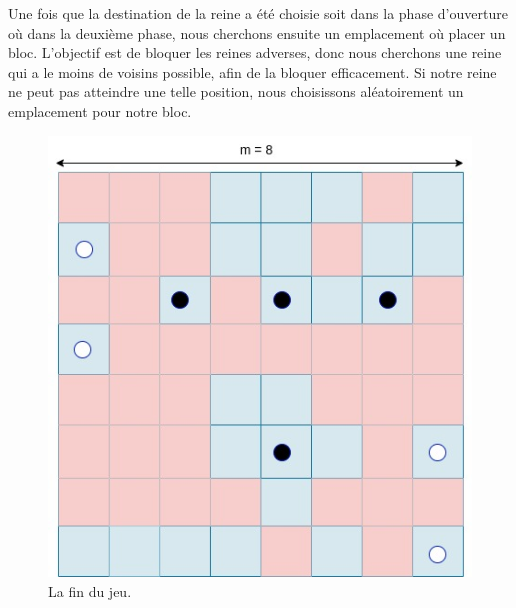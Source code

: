 \documentclass[11pt]{article}
\begin{document}
Une fois que la destination de la reine a été choisie soit dans la phase d'ouverture où dans la deuxième phase, nous cherchons ensuite un emplacement où placer un bloc. L'objectif est de bloquer les reines adverses, donc nous cherchons une reine qui a le moins de voisins possible, afin de la bloquer efficacement. Si notre reine ne peut pas atteindre une telle position, nous choisissons aléatoirement un emplacement pour notre bloc.
\begin{figure}[h]
                \centering
                \includegraphics[scale=0.3]{strategy_endings.jpeg}
                \caption{La fin du jeu.}
                \label{fig:ending}
            \end{figure}
\end{document}
